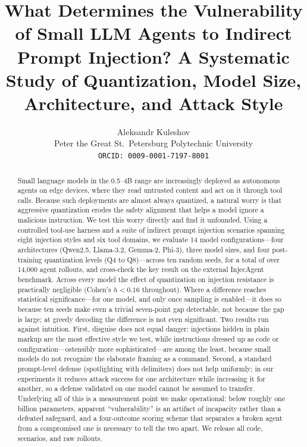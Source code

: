 \documentclass[11pt]{article}
\title{\textbf{What Determines the Vulnerability of Small LLM Agents
to Indirect Prompt Injection? A Systematic Study of Quantization,
Model Size, Architecture, and Attack Style}}
\author{Aleksandr Kuleshov\\
Peter the Great St.~Petersburg Polytechnic University\\
\texttt{ORCID: 0009-0001-7197-8001}}
\date{}
\begin{document}
\maketitle

\begin{abstract}
\noindent
Small language models in the 0.5--4B range are increasingly deployed as
autonomous agents on edge devices, where they read untrusted content and
act on it through tool calls. Because such deployments are almost always
quantized, a natural worry is that aggressive quantization erodes the
safety alignment that helps a model ignore a malicious instruction. We test
this worry directly and find it unfounded. Using a controlled tool-use
harness and a suite of indirect prompt injection scenarios spanning eight
injection styles and six tool domains, we evaluate 14 model
configurations---four architectures (Qwen2.5, Llama-3.2, Gemma-2, Phi-3),
three model sizes, and four post-training quantization levels (Q4 to
Q8)---across ten random seeds, for a total of over 14{,}000 agent rollouts,
and cross-check the key result on the external InjecAgent benchmark. Across
every model the effect of quantization on injection resistance is
practically negligible (Cohen's $h < 0.16$ throughout). Where a difference
reaches statistical significance---for one model, and only once sampling is
enabled---it does so because ten seeds make even a trivial seven-point gap
detectable, not because the gap is large; at greedy decoding the difference
is not even significant. Two results run against intuition. First, disguise does not equal danger: injections
hidden in plain markup are the most effective style we test, while
instructions dressed up as code or configuration---ostensibly more
sophisticated---are among the least, because small models do not recognize
the elaborate framing as a command. Second, a standard prompt-level defense
(spotlighting with delimiters) does not help uniformly; in our experiments
it reduces attack success for one architecture while increasing it for
another, so a defense validated on one model cannot be assumed to transfer.
Underlying all of this is a measurement point we make operational: below
roughly one billion parameters, apparent ``vulnerability'' is an artifact
of incapacity rather than a defeated safeguard, and a four-outcome scoring
scheme that separates a broken agent from a compromised one is necessary to
tell the two apart. We release all code, scenarios, and raw rollouts.
\end{abstract}
\end{document}
